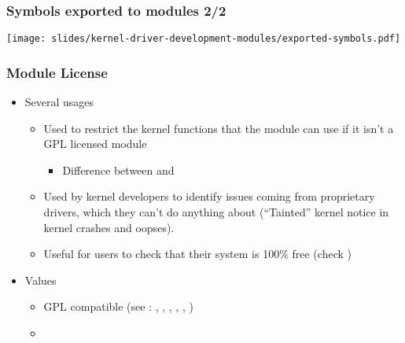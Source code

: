 \begin{frame}
  \frametitle{Symbols exported to modules 2/2}
  \begin{center}
    \texttt{[image: slides/kernel-driver-development-modules/exported-symbols.pdf]}
  \end{center}
\end{frame}

\begin{frame}
  \frametitle{Module License}
  \begin{itemize}
  \item Several usages
    \begin{itemize}
    \item Used to restrict the kernel functions that the module can
      use if it isn't a GPL licensed module
      \begin{itemize}
      \item Difference between  and
      \end{itemize}
    \item Used by kernel developers to identify issues coming from
      proprietary drivers, which they can't do anything about
      (“Tainted” kernel notice in kernel crashes and oopses).
    \item Useful for users to check that their system is 100\% free
      (check )
    \end{itemize}
  \item Values
    \begin{itemize}
    \item GPL compatible (see :
      , , ,
      , , )
    \item {}
    \end{itemize}
  \end{itemize}
\end{frame}

